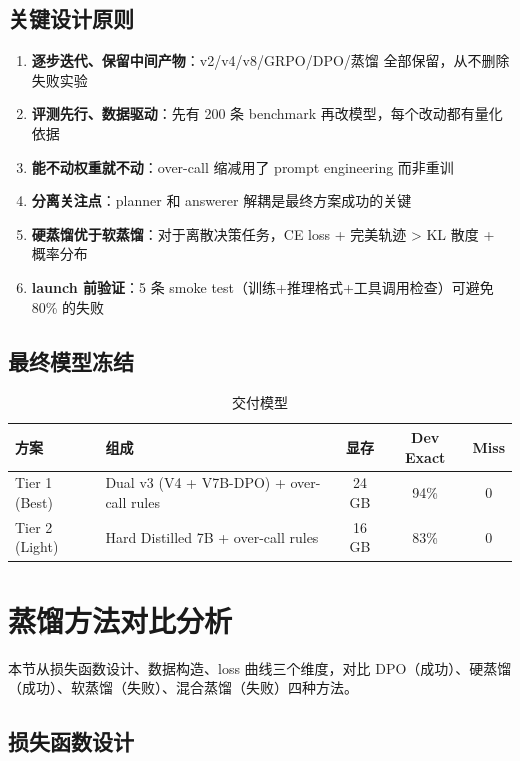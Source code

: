 \documentclass[12pt,a4paper]{ctexart}
\begin{document}
\subsection{关键设计原则}

\begin{enumerate}
  \item \textbf{逐步迭代、保留中间产物}：v2/v4/v8/GRPO/DPO/蒸馏 全部保留，从不删除失败实验
  \item \textbf{评测先行、数据驱动}：先有 200 条 benchmark 再改模型，每个改动都有量化依据
  \item \textbf{能不动权重就不动}：over-call 缩减用了 prompt engineering 而非重训
  \item \textbf{分离关注点}：planner 和 answerer 解耦是最终方案成功的关键
  \item \textbf{硬蒸馏优于软蒸馏}：对于离散决策任务，CE loss + 完美轨迹 > KL 散度 + 概率分布
  \item \textbf{launch 前验证}：5 条 smoke test（训练+推理格式+工具调用检查）可避免 80\% 的失败
\end{enumerate}

\subsection{最终模型冻结}

\begin{table}[H]
\centering
\caption{交付模型}
\begin{tabular}{llccc}
\toprule
方案 & 组成 & 显存 & Dev Exact & Miss \\
\midrule
Tier 1 (Best) & Dual v3 (V4 + V7B-DPO) + over-call rules & 24 GB & 94\% & 0 \\
Tier 2 (Light) & Hard Distilled 7B + over-call rules & 16 GB & 83\% & 0 \\
\bottomrule
\end{tabular}
\end{table}

\section{蒸馏方法对比分析}

本节从损失函数设计、数据构造、loss 曲线三个维度，对比 DPO（成功）、硬蒸馏（成功）、软蒸馏（失败）、混合蒸馏（失败）四种方法。

\subsection{损失函数设计}
\end{document}
